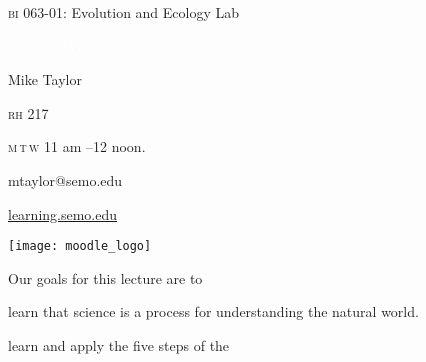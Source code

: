 \documentclass[t]{beamer}
\begin{document}

{
\begin{frame}[b,plain]{\textcolor{orange7}{\textsc{bi} 063-01: Evolution and Ecology Lab}}


\hfill\textcolor{white}{\tiny Fir0002, Wikimedia }
\end{frame}
}

{
\begin{frame}[t,plain]
	\large
	\vspace{5ex}
	\hangpara\hspace{17em} Mike Taylor

	\hangpara\hspace{17em} \textsc{rh} 217

	\hangpara\hspace{17em} \textsc{m}\,\textsc{t}\,\textsc{w} 11 am --12 noon.

	\hangpara\hspace{17em} mtaylor@semo.edu

\end{frame}
}


\begin{frame}[t]{\href{http://learning.semo.edu}{learning.semo.edu}}
	\begin{center}
		\texttt{[image: moodle\_logo]}
		
		\medskip
		
	\end{center}
	
\end{frame}




\begin{frame}[t]{Our goals for this lecture are to}

	\hangpara learn that science is a process for understanding the natural world.
	
	\hangpara learn and apply the five steps of the 
		
\end{frame}

\end{document}
